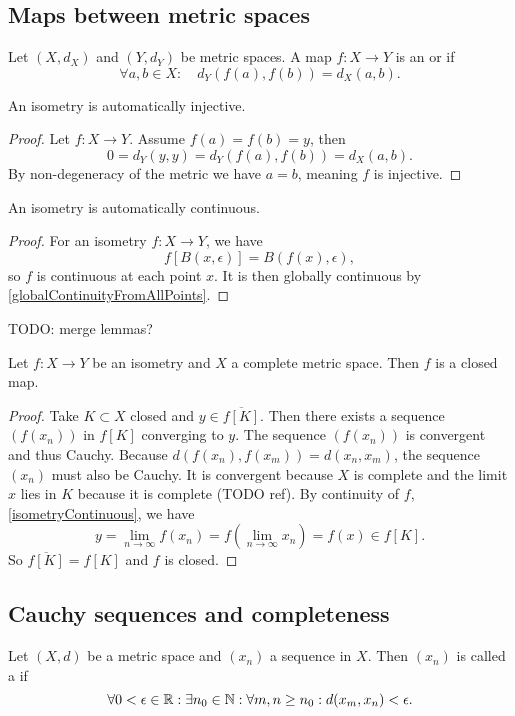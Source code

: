 \subsection{Maps between metric spaces}
\begin{definition}
Let $(X,d_X)$ and $(Y,d_Y)$ be metric spaces. A map $f:X\to Y$ is an  or  if
\[ \forall a,b \in X: \quad d_Y(f(a),f(b)) = d_X(a,b). \]
\end{definition}
\begin{lemma} \label{isometryInjective}
An isometry is automatically injective.
\end{lemma}
\begin{proof}
Let $f: X\to Y$. Assume $f(a) = f(b) = y$, then
\[ 0 = d_Y(y,y) = d_Y(f(a),f(b)) = d_X(a,b). \]
By non-degeneracy of the metric we have $a=b$, meaning $f$ is injective.
\end{proof}
\begin{lemma} \label{isometryContinuous}
An isometry is automatically continuous.
\end{lemma}
\begin{proof}
For an isometry $f:X\to Y$, we have
\[ f[B(x,\epsilon)] = B(f(x),\epsilon), \]
so $f$ is continuous at each point $x$. It is then globally continuous by \ref{globalContinuityFromAllPoints}.
\end{proof}
TODO: merge lemmas?

\begin{lemma} \label{isometryClosed}
Let $f:X\to Y$ be an isometry and $X$ a complete metric space. Then $f$ is a closed map.
\end{lemma}
\begin{proof}
Take $K\subset X$ closed and $y\in\overline{f[K]}$. Then there exists a sequence $(f(x_n))$ in $f[K]$ converging to $y$. The sequence $(f(x_n))$ is convergent and thus Cauchy. Because $d(f(x_n), f(x_m)) = d(x_n,x_m)$, the sequence $(x_n)$ must also be Cauchy. It is convergent because $X$ is complete and the limit $x$ lies in $K$ because it is complete (TODO ref). By continuity of $f$, \ref{isometryContinuous}, we have
\[ y = \lim_{n\to\infty} f(x_n) = f(\lim_{n\to\infty}x_n) = f(x) \in f[K]. \]
So $\overline{f[K]} = f[K]$ and $f$ is closed.
\end{proof}

\subsection{Cauchy sequences and completeness}
\begin{definition}
Let $(X,d)$ be a metric space and $(x_n)$ a sequence in $X$. Then $(x_n)$ is called a  if
\[ \forall 0 < \epsilon \in \mathbb{R}: \exists n_0\in \mathbb{N}: \forall m,n \geq n_0: d(x_m,x_n) < \epsilon.  \]
\end{definition}

